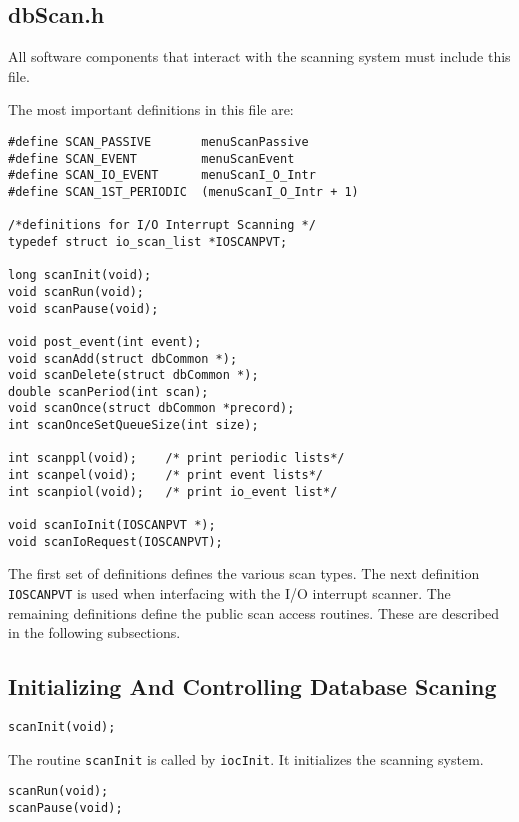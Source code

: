 \subsection{dbScan.h}

All software components that interact with the scanning system must include this file.

The most important definitions in this file are:

\begin{verbatim}
#define SCAN_PASSIVE       menuScanPassive
#define SCAN_EVENT         menuScanEvent
#define SCAN_IO_EVENT      menuScanI_O_Intr
#define SCAN_1ST_PERIODIC  (menuScanI_O_Intr + 1)

/*definitions for I/O Interrupt Scanning */
typedef struct io_scan_list *IOSCANPVT;

long scanInit(void);
void scanRun(void);
void scanPause(void);

void post_event(int event);
void scanAdd(struct dbCommon *);
void scanDelete(struct dbCommon *);
double scanPeriod(int scan);
void scanOnce(struct dbCommon *precord);
int scanOnceSetQueueSize(int size);

int scanppl(void);    /* print periodic lists*/
int scanpel(void);    /* print event lists*/
int scanpiol(void);   /* print io_event list*/

void scanIoInit(IOSCANPVT *);
void scanIoRequest(IOSCANPVT);
\end{verbatim}

The first set of definitions defines the various scan types.
The next definition \verb|IOSCANPVT| is used when interfacing with the I/O interrupt scanner.
The remaining definitions define the public scan access routines.
These are described in the following subsections.

\subsection{Initializing And Controlling Database Scaning}

\begin{verbatim}
scanInit(void);
\end{verbatim}

The routine \verb|scanInit| is called by \verb|iocInit|.
It initializes the scanning system.

\begin{verbatim}
scanRun(void);
scanPause(void);
\end{verbatim}

